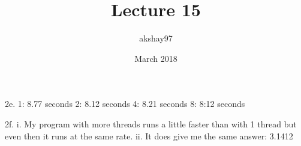 \documentclass{article}
\title{Lecture 15}
\author{akshay97 }
\date{March 2018}
\begin{document}
\maketitle

2e. 
1: 8.77 seconds
2: 8.12 seconds 
4: 8.21 seconds
8: 8:12 seconds 

2f. 
    i. My program with more threads runs a little faster than with 1 thread but even then it runs at the same rate.
    ii. It does give me the same answer: 3.1412
\end{document}

